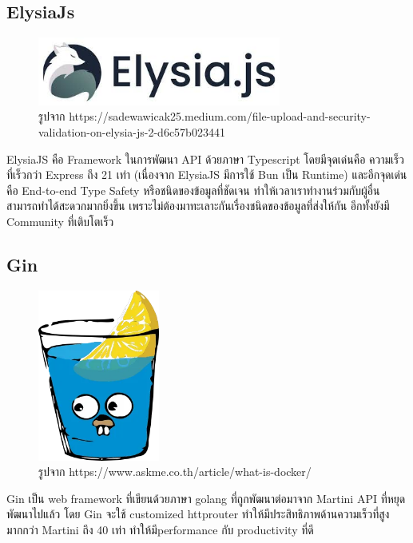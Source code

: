 \subsection{ElysiaJs}
\begin{figure}[H] %
    \centering
    \includegraphics[width=80mm, keepaspectratio ]{pictures/elysia.jpg}
    \caption[Poem]{รูปจาก https://sadewawicak25.medium.com/file-upload-and-security-validation-on-elysia-js-2-d6c57b023441}
    \label{fig:elysia}
\end{figure}
\hspace{1.27cm}ElysiaJS\cite{ElysiaJs} คือ Framework ในการพัฒนา API ด้วยภาษา Typescript โดยมีจุดเด่นคือ ความเร็วที่เร็วกว่า Express ถึง 21 เท่า (เนื่องจาก ElysiaJS มีการใช้ Bun เป็น Runtime) และอีกจุดเด่นคือ End-to-end Type Safety หรือชนิดของข้อมูลที่ชัดเจน ทำให้เวลาเราทำงานร่วมกับผู้อื่นสามารถทำได้สะดวกมากยิ่งขึ้น เพราะไม่ต้องมาทะเลาะกันเรื่องชนิดของข้อมูลที่ส่งให้กัน อีกทั้งยังมี Community ที่เติบโตเร็ว


\subsection{Gin}
\begin{figure}[H]
  \centering
  \includegraphics[width=40mm, keepaspectratio ]{pictures/gin.png}
  \caption[Poem]{รูปจาก https://www.askme.co.th/article/what-is-docker/}
  \label{fig:gin}
\end{figure}
\hspace{1.27cm}Gin\cite{Gin101} เป็น web framework ที่เขียนด้วยภาษา golang ที่ถูกพัฒนาต่อมาจาก Martini API ที่หยุดพัฒนาไปแล้ว โดย Gin จะใช้ customized httprouter ทำให้มีประสิทธิภาพด้านความเร็วที่สูงมากกว่า Martini ถึง 40 \cite{GinFeature}เท่า ทำให้มีperformance กับ productivity ที่ดี 

